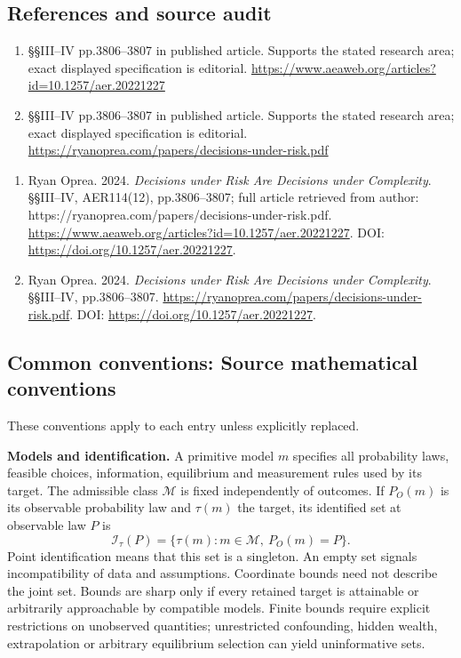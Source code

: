 \documentclass[11pt,a4paper]{article}
\begin{document}
\subsection*{References and source audit}
\begin{enumerate}
\item §§III–IV pp.3806–3807 in published article. Supports the stated research area; exact displayed specification is editorial. \url{https://www.aeaweb.org/articles?id=10.1257/aer.20221227}
\item §§III–IV pp.3806–3807 in published article. Supports the stated research area; exact displayed specification is editorial. \url{https://ryanoprea.com/papers/decisions-under-risk.pdf}
\end{enumerate}
\begin{enumerate}\raggedright
\item\hypertarget{definitions:source:30007582:1}{} Ryan Oprea. 2024. \emph{Decisions under Risk Are Decisions under Complexity}. §§III–IV, AER114(12), pp.3806–3807; full article retrieved from author: https://ryanoprea.com/papers/decisions-under-risk.pdf.
\url{https://www.aeaweb.org/articles?id=10.1257/aer.20221227}.
DOI: \url{https://doi.org/10.1257/aer.20221227}.
\item\hypertarget{definitions:source:30007582:2}{} Ryan Oprea. 2024. \emph{Decisions under Risk Are Decisions under Complexity}. §§III–IV, pp.3806–3807.
\url{https://ryanoprea.com/papers/decisions-under-risk.pdf}.
DOI: \url{https://doi.org/10.1257/aer.20221227}.
\end{enumerate}

\subsection*{Common conventions: Source mathematical conventions}

These conventions apply to each entry unless explicitly replaced.

\textbf{Models and identification.} A primitive model \(m\) specifies all probability laws, feasible choices, information, equilibrium and measurement rules used by its target. The admissible class \(\mathcal M\) is fixed independently of outcomes. If \(P_O(m)\) is its observable probability law and \(\tau(m)\) the target, its identified set at observable law \(P\) is
\[
 \mathcal I_\tau(P)=\{\tau(m):m\in\mathcal M,\ P_O(m)=P\}.
\]
Point identification means that this set is a singleton. An empty set signals incompatibility of data and assumptions. Coordinate bounds need not describe the joint set. Bounds are sharp only if every retained target is attainable or arbitrarily approachable by compatible models. Finite bounds require explicit restrictions on unobserved quantities; unrestricted confounding, hidden wealth, extrapolation or arbitrary equilibrium selection can yield uninformative sets.
\end{document}
